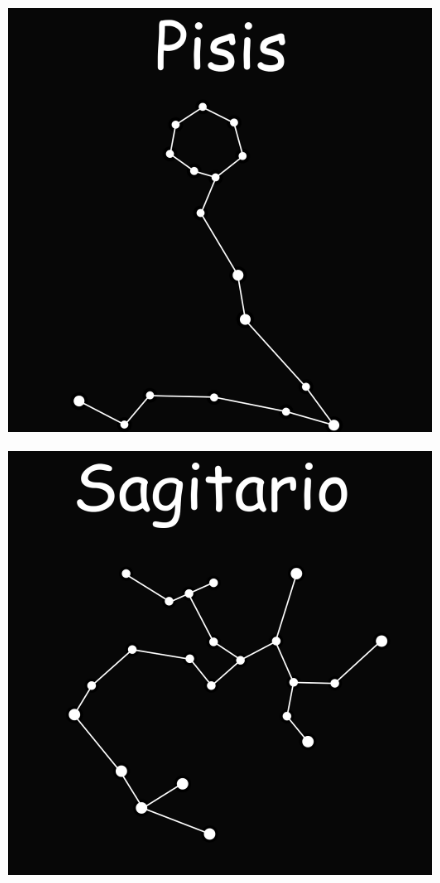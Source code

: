 \documentclass{beamer}
\begin{document}
\begin{frame}
 \begin{figure}
   \centering
   \includegraphics[scale=0.2]{Imagenes/Pisis_01}
  \end{figure}
\end{frame}

\begin{frame}
 \begin{figure}
   \centering
   \includegraphics[scale=0.2]{Imagenes/Sagitario_01}
  \end{figure}
\end{frame}
\end{document}
